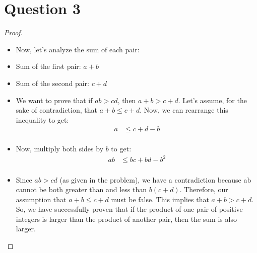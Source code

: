 \documentclass{article}
\begin{document}
\section*{Question 3}

\begin{proof}
    \begin{itemize}
    Let’s consider two pairs of positive integers: (a, b) and (c, d), where a, b, c, d
are positive integers. We are given that the product of the first pair is larger than
the product of the second pair, i.e., $ab > cd$
\item[] Now, let's analyze the sum of each pair:
\item[] Sum of the first pair: $a + b$
\item[] Sum of the second pair: $c + d$
\item[] We want to prove that if $ab > cd$, then $a + b > c + d$. Let's assume, for the sake of contradiction, that $a + b \leq c + d$.
Now, we can rearrange this inequality to get:
\begin{align*}
    a &\leq c + d - b\\
\end{align*}
\item[] Now, multiply both sides by $b$ to get:
\begin{align*}
    ab &\leq bc + bd - b^2\\
\end{align*}
\item[] Since $ab > cd$ (as given in the problem), we have a contradiction because ab
cannot be both greater than and less than $b(c + d)$. Therefore, our assumption that
$a + b \leq c + d$ must be false. This implies that $a + b > c + d$. So, we have successfully
proven that if the product of one pair of positive integers is larger than the product
of another pair, then the sum is also larger.
\end{itemize}
\end{proof}
\end{document}

